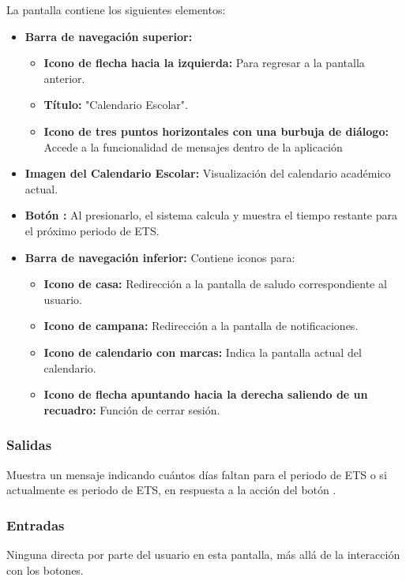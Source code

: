 La pantalla contiene los siguientes elementos:
\begin{itemize}
	\item \textbf{Barra de navegación superior:}
	\begin{itemize}
		\item \textbf{Icono de flecha hacia la izquierda:} Para regresar a la pantalla anterior.
		\item \textbf{Título:} "Calendario Escolar".
		\item \textbf{Icono de tres puntos horizontales con una burbuja de diálogo:} Accede a la funcionalidad de mensajes dentro de la aplicación
	\end{itemize}
	\item \textbf{Imagen del Calendario Escolar:} Visualización del calendario académico actual.
	\item \textbf{Botón :} Al presionarlo, el sistema calcula y muestra el tiempo restante para el próximo periodo de ETS.
	\item \textbf{Barra de navegación inferior:} Contiene iconos para:
	\begin{itemize}
		\item \textbf{Icono de casa:} Redirección a la pantalla de saludo correspondiente al usuario.
		\item \textbf{Icono de campana:} Redirección a la pantalla de notificaciones.
		\item \textbf{Icono de calendario con marcas:} Indica la pantalla actual del calendario.
		\item \textbf{Icono de flecha apuntando hacia la derecha saliendo de un recuadro:} Función de cerrar sesión.
	\end{itemize}
\end{itemize}

\subsubsection{Salidas}
Muestra un mensaje indicando cuántos días faltan para el periodo de ETS o si actualmente es periodo de ETS, en respuesta a la acción del botón .

\subsubsection{Entradas}
Ninguna directa por parte del usuario en esta pantalla, más allá de la interacción con los botones.

